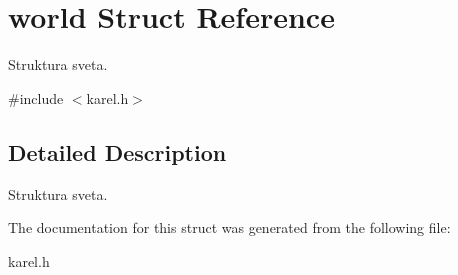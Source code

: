\hypertarget{structworld}{
\section{world Struct Reference}
\label{structworld}
}


Struktura sveta.  




{\ttfamily \#include $<$karel.h$>$}



\subsection{Detailed Description}
Struktura sveta. 

The documentation for this struct was generated from the following file:\begin{DoxyCompactItemize}
\item 
karel.h\end{DoxyCompactItemize}

